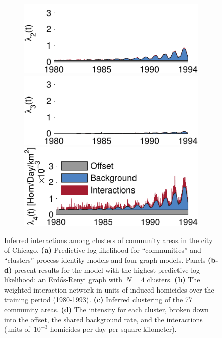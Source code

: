 \begin{figure}[!t]
\begin{center}
\begin{subfigure}[B]{.28\textwidth}
      \includegraphics[width=\linewidth]{figures/ch2/icpsr_rate2} \\ 
      \includegraphics[width=\linewidth]{figures/ch2/icpsr_rate3} \\
      \includegraphics[width=\linewidth]{figures/ch2/icpsr_rate4} 
      \label{fig:chicago_rates}
    \end{subfigure}
  \end{center}
\vspace{-1em}
\caption[Inferred gang interactions in the city of Chicago]{
  Inferred interactions among clusters of community areas in the city of Chicago.
  \textbf{(a)} Predictive log likelihood for ``communities'' and ``clusters''  process identity models and four graph models. 
  Panels \textbf{(b-d)} present results for the model with the highest predictive log likelihood: an Erd\H{o}s-Renyi graph with~${N=4}$ clusters.
  \textbf{(b)} The weighted interaction network in units of induced homicides over the training period (1980-1993).
  \textbf{(c)} Inferred clustering of the 77 community areas.
  \textbf{(d)} The intensity for each cluster, broken down into the offset, the shared background rate, and the interactions (units of~${10^{-3}}$ homicides per day per square kilometer).}
\label{fig:chicago}
\end{figure}

